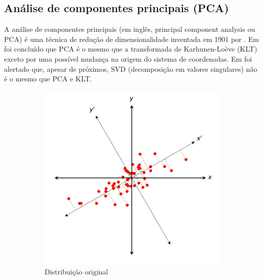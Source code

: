 \subsection{Análise de componentes principais (PCA)}\label{sec:pca}

A análise de componentes principais (em inglês, principal component analysis ou PCA) é uma técnica de redução de dimensionalidade inventada em 1901 por .
Em \cite{gerbrands1981relationships} foi concluído que PCA é o mesmo que a transformada de Karhunen-Loève (KLT) exceto por uma possível mudança na origem do sistema de coordenadas.
Em \cite{andrews1975two} foi alertado que, apesar de próximos, SVD (decomposição em valores singulares) não é o mesmo que PCA e KLT. 

\begin{figure}[htbp]
    \caption{Análise de Componentes Principais}
    \label{fig:pca}
    \begin{subfigure}[c]{0.45\textwidth}
    \centering
    \includegraphics[width=\textwidth]{imagens/pca1.pdf}
    \caption{Distribuição original}
    \end{subfigure}
    \begin{subfigure}[c]{0.45\textwidth}
    \centering

\end{subfigure}
\end{figure}

